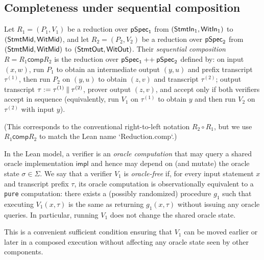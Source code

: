 \subsection{Completeness under sequential composition}

\begin{definition}
Let $R_1=(P_1,V_1)$ be a reduction over $\mathsf{pSpec}_1$ from $(\mathsf{StmtIn}_1,\mathsf{WitIn}_1)$ to $(\mathsf{StmtMid},\mathsf{WitMid})$,
and let $R_2=(P_2,V_2)$ be a reduction over $\mathsf{pSpec}_2$ from $(\mathsf{StmtMid},\mathsf{WitMid})$ to $(\mathsf{StmtOut},\mathsf{WitOut})$.
Their \emph{sequential composition} $R = R_1 \mathbin{\mathsf{comp}} R_2$ is the reduction over
$\mathsf{pSpec}_1 \mathbin{++} \mathsf{pSpec}_2$ defined by: on input $(x,w)$, run $P_1$ to obtain an intermediate
output $(y,u)$ and prefix transcript $\tau^{(1)}$, then run $P_2$ on $(y,u)$ to obtain $(z,v)$ and
transcript $\tau^{(2)}$; output transcript $\tau \mathrel{:=} \tau^{(1)} \mathbin{\|} \tau^{(2)}$, prover
output $(z,v)$, and accept only if both verifiers accept in sequence (equivalently, run $V_1$ on
$\tau^{(1)}$ to obtain $y$ and then run $V_2$ on $\tau^{(2)}$ with input $y$).

\smallskip
\noindent
(This corresponds to the conventional right-to-left notation $R_2 \circ R_1$, but we use
$R_1 \mathbin{\mathsf{comp}} R_2$ to match the Lean name `Reduction.comp`.)
\end{definition}

\begin{definition}
\label{def:oraclefree_verifier}
In the Lean model, a verifier is an \emph{oracle computation} that may query a shared oracle
implementation $\mathsf{impl}$ and hence may depend on (and mutate) the oracle state $\sigma\in\Sigma$.
We say that a verifier $V_1$ is \emph{oracle-free} if, for every input statement $x$ and transcript
prefix $\tau$, its oracle computation is observationally equivalent to a \texttt{pure} computation:
there exists a (possibly randomized) procedure $g_1$ such that executing $V_1(x,\tau)$ is the same as
returning $g_1(x,\tau)$ without issuing any oracle queries. In particular, running $V_1$ does not
change the shared oracle state.

This is a convenient sufficient condition ensuring that $V_1$ can be moved earlier or later in a
composed execution without affecting any oracle state seen by other components.
\end{definition}

